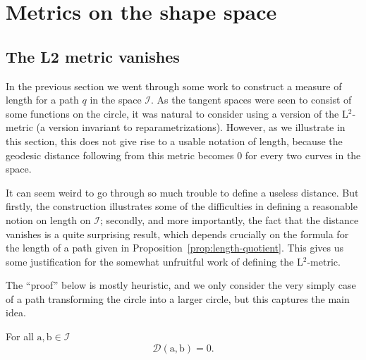 
\section{Metrics on the shape space}
\label{sec:metrics-shape-space}


\subsection{The L2 metric vanishes}
\label{sec:l2-metric-vanishes}

In the previous section we went through some work to construct a measure of length for a path $q$ in the space $\mathcal{I}$. As the tangent spaces were seen to consist of some functions on the circle, it was natural to consider using a version of the L$^2$-metric (a version invariant to reparametrizations). However, as we illustrate in this section, this does not give rise to a usable notation of length, because the geodesic distance following from this metric becomes 0 for every two curves in the space.

It can seem weird to go through so much trouble to define a useless distance. But firstly, the construction illustrates some of the difficulties in defining a reasonable notion on length on $\mathcal{I}$; secondly, and more importantly, the fact that the distance vanishes is a quite surprising result, which depends crucially on the formula for the length of a path given in Proposition~\ref{prop:length-quotient}. This gives us some justification for the somewhat unfruitful work of defining the L$^2$-metric.

The ``proof'' below is mostly heuristic, and we only consider the very simply case of a path transforming the circle into a larger circle, but this captures the main idea.
\begin{theorem}
  \label{theorem:l2-metric-vanishes}
  For all $\mathrm{a},\mathrm{b} \in \mathcal{I}$
  \begin{equation*}
    \mathcal{D}(\mathrm{a},\mathrm{b}) = 0.
  \end{equation*}
\end{theorem}

